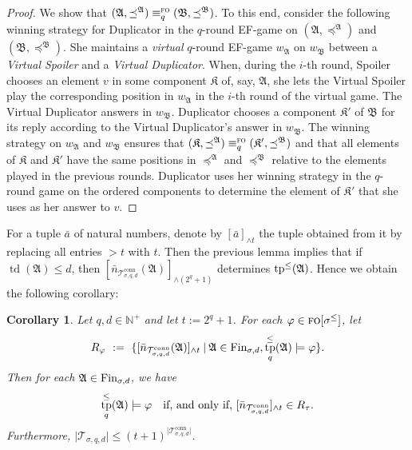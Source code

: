 \documentclass[11pt]{article}
\newtheorem{corollary}[theorem]{Corollary}
\renewcommand{\phi}{\varphi}
\newcommand{\fin}{\textup{Fin}}
\newcommand{\conn}{\text{conn}}
\newcommand{\logic}[1]{\textsc{#1}}
\newcommand{\FO}{\logic{fo}}
\newcommand{\eleq}[1][]{\equiv_{#1}}
\newcommand{\foeleq}[1][]{\eleq[#1]^{\FO{}}}
\newcommand{\types}[1][\sigma,q,d]{\mathcal{T}_{#1}}
\newcommand{\redmax}[2]{[#1]_{{\wedge}#2}}
\newcommand{\st}{\mathbin |}
\newcommand{\absval}[1]{\vert #1 \vert}
\newcommand{\leqsym}{\logic{\ensuremath{\leq}}}
\DeclareMathOperator{\tp}{tp}
\newcommand{\struct}[1]{\mathfrak{#1}}
\newcommand{\AS}{\struct{A}}
\newcommand{\BS}{\struct{B}}
\newcommand{\KS}{\struct{K}}
\newcommand{\td}{\operatorname{td}}
\newcommand{\Npos}{\mathbb{N}^{+}}
\begin{document}
\begin{proof}
  We show that $(\AS,\preceq^\AS)\foeleq[q](\BS,\preceq^\BS)$.  To
  this end, consider the following winning strategy for Duplicator in
  the $q$-round EF-game on $(\AS,\preceq^\AS)$ and
  $(\BS,\preceq^\BS)$. She maintains a \emph{virtual} $q$-round
  EF-game $w_{\AS}$ on $w_{\BS}$ between a \emph{Virtual Spoiler} and
  a \emph{Virtual Duplicator}. When, during the $i$-th round, Spoiler
  chooses an element $v$ in some component $\KS$ of, say, $\AS$, she
  lets the Virtual Spoiler play the corresponding position in
  $w_{\AS}$ in the $i$-th round of the virtual game. The Virtual
  Duplicator answers in $w_{\BS}$. Duplicator chooses a component
  $\KS'$ of $\BS$ for its reply according to the Virtual Duplicator's
  answer in $w_{\BS}$. The winning strategy on $w_{\AS}$ and $w_{\BS}$
  ensures that $(\KS,\preceq^\AS) \foeleq[q] (\KS',\preceq^\BS)$ and
  that all elements of $\KS$ and $\KS'$ have the same positions in
  $\preceq^\AS$ and $\preceq^\BS$ relative to the elements played in
  the previous rounds. Duplicator uses her winning strategy in the
  $q$-round game on the ordered components to determine the element of
  $\KS'$ that she uses as her answer to $v$.
\end{proof}

For a tuple $\bar a$ of natural numbers, denote by $\redmax{\bar a}{t}$ the
tuple obtained from it by replacing all entries $> t$ with $t$.  Then
the previous lemma implies that if $\td(\AS) \leq d$, then
$\redmax{\bar n_{\types^\conn}(\AS)}{(2^q + 1)}$ determines
$\tp^{\leqsym}(\AS)$. Hence we obtain the following corollary:

\begin{corollary}
  \label{cor:tau-set}
  Let $q,d\in \Npos$ and let $t:=2^q+1$. For each $\phi \in \FO[\sigma^{\leq}]$, let
  \[
  R_\phi \ := \ \{ \redmax{\bar n_{\types^\conn}(\AS)}{t} \st \AS\in
  \fin_{\sigma,d}, \tp^\leqsym_q(\AS)\models \phi\}. 
  \]
  Then for each $\AS\in \fin_{\sigma,d}$, we have
  \[
  \tp^\leqsym_q(\AS)\models \phi
  \quad\text{if, and only if, }
  \redmax{\bar n_{\types^\conn}}{t} \in
  R_\tau.
  \]
  Furthermore, $\absval{\types[\sigma,q,d]} \leq
  (t+1)^{\absval{\types^\conn}}$.
\end{corollary}
\end{document}
